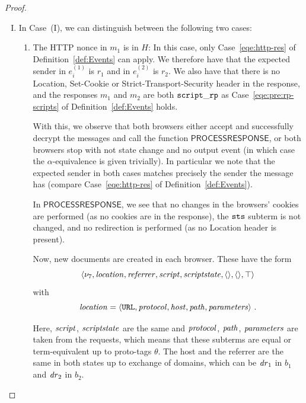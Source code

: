 \begin{theorem}
\begin{proof}
\begin{description}
        \begin{enumerate}[I.]
        \item\label{browser-http-response-normal} 
          In Case~(I), we can distinguish between the following two cases:
          \begin{enumerate}
            \item The HTTP nonce in $m_1$ is in $H$: 
              In this case, only Case~\ref{eqe:http-res} of Definition~\ref{def:Events} can apply. 
              We therefore have that the expected sender in $e_i^{(1)}$ is $r_1$ and in $e_i^{(2)}$ is $r_2$. 
              We also have that there is no Location, Set-Cookie or Strict-Transport-Security header in the response, 
              and the responses $m_1$ and $m_2$ are both $\mathtt{script\_rp}$ as Case~\ref{eqe:pre:rp-scripts} of Definition~\ref{def:Events} holds.
      
              With this, we observe that both browsers either accept and
              successfully decrypt the messages and call the function
              $\mathsf{PROCESSRESPONSE}$, or both browsers stop with not
              state change and no output event (in which case the
              $\alpha$-equivalence is given trivially). In particular we
              note that the expected sender in both cases matches precisely
              the sender the message has (compare Case~\ref{eqe:http-res} of
              Definition~\ref{def:Events}).
      
              In $\mathsf{PROCESSRESPONSE}$, we see that no changes in the
              browsers' cookies are performed (as no cookies are in the
              response), the $\mathtt{sts}$ subterm is not changed, and no
              redirection is performed (as no Location header is present).
      
              Now, new documents are created in each browser. These have the
              form
              \[ \langle\nu_7, \mathit{location}, \mathit{referrer}, \mathit{script},
                \mathit{scriptstate}, \langle\rangle, \langle\rangle, \top\rangle \] with
              \[ \mathit{location} = \langle\mathtt{URL}, \mathit{protocol}, \mathit{host},
                \mathit{path}, \mathit{parameters}\rangle\ .\]
      
            
              Here, $\mathit{script}$, $\mathit{scriptstate}$ are the same and
              $\mathit{protocol}$, $\mathit{path}$, $\mathit{parameters}$ are taken from
              the requests, which means that these subterms are equal or
              term-equivalent up to proto-tags $\theta$. 
              The host and the referrer are the same in both states up to exchange of domains, 
              which can be $\mathit{dr}_1$ in $b_1$ and $\mathit{dr}_2$ in $b_2$.
      

\end{enumerate}
\end{enumerate}
\end{description}
\end{proof}
\end{theorem}
